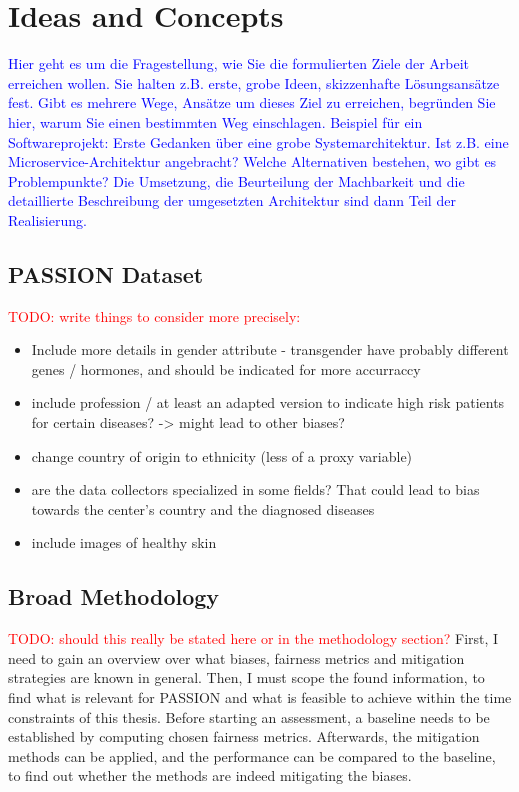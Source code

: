 \documentclass[12pt, a4paper, oneside]{book}   	%
\renewcommand{\todo}[1]{\textcolor{red}{TODO: #1}}
\newcommand{\baaCriteria}[1]{\textcolor{blue}{#1}}
\begin{document}
	\chapter{Ideas and Concepts}
		\baaCriteria{Hier geht es um die Fragestellung, wie Sie die formulierten Ziele der Arbeit erreichen wollen. Sie halten z.B. erste, grobe Ideen, skizzenhafte Lösungsansätze fest. Gibt es mehrere Wege, Ansätze um dieses Ziel zu erreichen, begründen Sie hier, warum Sie einen bestimmten Weg einschlagen. Beispiel für ein Softwareprojekt: Erste Gedanken über eine grobe Systemarchitektur. Ist z.B. eine Microservice-Architektur angebracht? Welche Alternativen bestehen, wo gibt es Problempunkte? Die Umsetzung, die Beurteilung der Machbarkeit und die detaillierte Beschreibung der umgesetzten Architektur sind dann Teil der Realisierung.}
					
		\section{PASSION Dataset}
			\todo{write things to consider more precisely:}
			\begin{itemize}
				\item Include more details in gender attribute - transgender have probably different genes / hormones, and should be indicated for more accurraccy
				\item include profession / at least an adapted version to indicate high risk patients for certain diseases? -> might lead to other biases?
				\item change country of origin to ethnicity (less of a proxy variable)
				\item are the data collectors specialized in some fields? That could lead to bias towards the center's country and the diagnosed diseases
				\item include images of healthy skin
			\end{itemize}
			
		\section{Broad Methodology}
			\todo{should this really be stated here or in the methodology section?}
			First, I need to gain an overview over what biases, fairness metrics and mitigation strategies are known in general.
			Then, I must scope the found information, to find what is relevant for PASSION and what is feasible to achieve within the time constraints of this thesis.
			Before starting an assessment, a baseline needs to be established by computing chosen fairness metrics.
			Afterwards, the mitigation methods can be applied, and the performance can be compared to the baseline, to find out whether the methods are indeed mitigating the biases.
		
\end{document}
